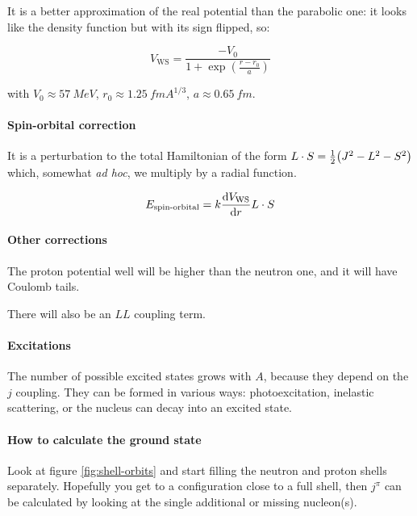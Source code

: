 \documentclass{article}
\begin{document}
It is a better approximation of the real potential than the parabolic one: it looks like the density function but with its sign flipped, so:

\begin{equation}
    V_ \text{WS} = \frac{-V_0}{1+ \exp(\frac{r-r_0}{a})}
\end{equation}

with \(V_0 \approx \SI{57}{MeV} \), \(r_0 \approx \SI{1.25}{fm} A^{1/3}\), \(a \approx \SI{0.65}{fm} \).


\paragraph{Spin-orbital correction}

It is a perturbation to the total Hamiltonian of the form \(L \cdot S = \frac{1}{2} \qty(J^2 - L^2 - S^2)\) which, somewhat \emph{ad hoc}, we multiply by a radial function.

\begin{equation}
    E_{\text{spin-orbital}} = k \dv{V _ \text{WS}}{r} L \cdot S
\end{equation}

\paragraph{Other corrections}

The proton potential well will be higher than the neutron one, and it will have Coulomb tails.

There will also be an \(LL\) coupling term.

\paragraph{Excitations}

The number of possible excited states grows with \(A\), because they depend on the \(j\) coupling. They can be formed in various ways: photoexcitation, inelastic scattering, or the nucleus can decay into an excited state.

\paragraph{How to calculate the ground state}

Look at figure \ref{fig:shell-orbits} and start filling the neutron and proton shells separately. Hopefully you get to a configuration close to a full shell, then \(j^\pi\) can be calculated by looking at the single additional or missing nucleon(s).
\end{document}

